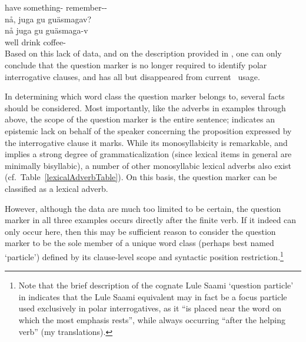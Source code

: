 	have\BS{}   something- remember--\\\nopagebreak
{}  %
\z
\ea\label{Qpart3}
\glll	nå, juga gu guäsmagav?\\
	nå juga gu guäsmaga-v\\
	well drink\BS{}  coffee-\\\nopagebreak
{} %
\z
Based on this lack of data, and on the description provided in \citet{Lagercrantz1926}, 
one can only conclude that the question marker is no longer required to identify polar interrogative clauses, and has all but disappeared from current \PS\ usage. %

In determining which word class the question marker belongs to, several facts should be considered. %
Most importantly, like the adverbs in examples  through  above, the scope of the question marker is the entire sentence; \TILDE{} indicates an epistemic lack on behalf of the speaker concerning the proposition expressed by the interrogative clause it marks. While its monosyllabicity is remarkable, and implies a strong degree of grammaticalization (since lexical items in general are minimally bisyllabic), a number of other monosyllabic lexical adverbs also exist (cf.~Table~\vref{lexicalAdverbTable}). On this basis, the question marker can be classified as a lexical adverb. 

However, although the data are much too limited to be certain, the question marker in all three examples occurs directly after the finite verb. If it indeed can only occur here, then this may be sufficient reason to consider the question marker to be the sole member of a unique word class (perhaps best named ‘particle’) defined by its clause-level scope and syntactic position restriction.\footnote{Note that the brief description of the cognate Lule Saami ‘question particle’ in \mbox{\citet[95]{Spiik1989}} indicates that the Lule Saami equivalent may in fact be a focus particle used exclusively in polar interrogatives, as it “is placed near the word on which the most emphasis rests”, while always occurring “after the helping verb” (my translations).} %




